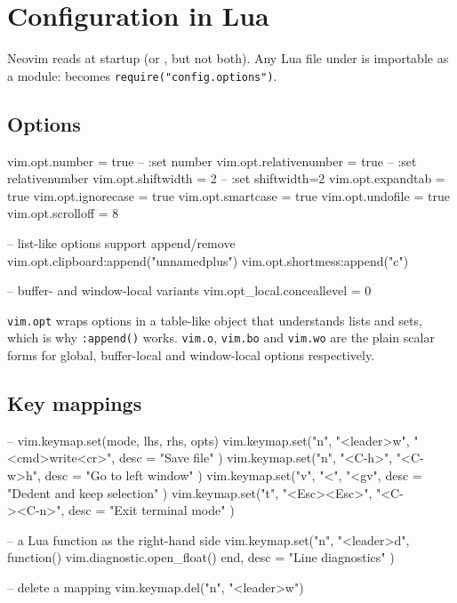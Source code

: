 \section{Configuration in Lua}\label{sec:lua-config}

Neovim reads  at startup (or
, but not both). Any Lua file under
 is importable as a module:
 becomes \texttt{require("config.options")}.

\subsection{Options}

\begin{luacode}
vim.opt.number = true            -- :set number
vim.opt.relativenumber = true    -- :set relativenumber
vim.opt.shiftwidth = 2           -- :set shiftwidth=2
vim.opt.expandtab = true
vim.opt.ignorecase = true
vim.opt.smartcase = true
vim.opt.undofile = true
vim.opt.scrolloff = 8

-- list-like options support append/remove
vim.opt.clipboard:append("unnamedplus")
vim.opt.shortmess:append("c")

-- buffer- and window-local variants
vim.opt_local.conceallevel = 0
\end{luacode}

\begin{note}
	\texttt{vim.opt} wraps options in a table-like object that understands lists
	and sets, which is why \texttt{:append()} works. \texttt{vim.o},
	\texttt{vim.bo} and \texttt{vim.wo} are the plain scalar forms for global,
	buffer-local and window-local options respectively.
\end{note}

\subsection{Key mappings}

\begin{luacode}
-- vim.keymap.set(mode, lhs, rhs, opts)
vim.keymap.set("n", "<leader>w", "<cmd>write<cr>", { desc = "Save file" })
vim.keymap.set("n", "<C-h>", "<C-w>h", { desc = "Go to left window" })
vim.keymap.set("v", "<", "<gv", { desc = "Dedent and keep selection" })
vim.keymap.set("t", "<Esc><Esc>", "<C-\\><C-n>", { desc = "Exit terminal mode" })

-- a Lua function as the right-hand side
vim.keymap.set("n", "<leader>d", function()
  vim.diagnostic.open_float()
end, { desc = "Line diagnostics" })

-- delete a mapping
vim.keymap.del("n", "<leader>w")
\end{luacode}

